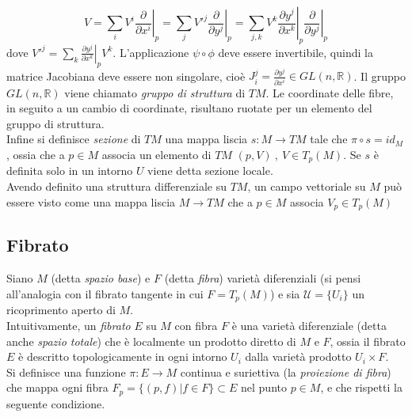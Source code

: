 $$
   V = \sum_i V^i  \left. \frac{\partial}{\partial x^i} \right |_p
     = \sum_j V'^j \left. \frac{\partial}{\partial y^j} \right |_p
     = \sum_{j,k}  V^k \left. \frac{\partial y^j}{\partial x^k} \right |_p
        \left. \frac{\partial}{\partial y^j} \right |_p
$$
dove $V'^j = \sum_k \left. \frac{\partial y^j}{\partial x^k}\right |_pV^k $.
L'applicazione $\psi \circ \phi$ deve essere invertibile, quindi la matrice Jacobiana
deve essere non singolare, cioè $J^j_i = \frac{\partial y^j}{\partial x^i} \in GL(n,\mathbb{R})$.
Il gruppo $GL(n,\mathbb{R})$ viene chiamato \emph{gruppo di struttura} di $TM$.
Le coordinate delle fibre, in seguito a un cambio di coordinate, risultano ruotate
per un elemento del gruppo di struttura.\\
Infine si definisce \emph{sezione} di $TM$ una mappa liscia $s : M \to TM$ tale
che $\pi \circ s = id_M$, ossia che a $p \in M$ associa un elemento di $TM$ $(p,V)
\: ,\: V \in T_p(M)$. Se $s$ è definita solo in un intorno $U$ viene detta sezione locale.\\

Avendo definito una struttura differenziale su $TM$, un campo vettoriale su $M$
può essere visto come una mappa liscia $M \to TM$ che a $p \in M$ associa $V_p \in T_p(M)$\\

\subsection{Fibrato}
Siano $M$ (detta \emph{spazio base}) e $F$ (detta \emph{fibra}) varietà diferenziali
(si pensi all'analogia con il fibrato tangente in cui $F=T_p(M)$) e sia
$\mathcal{U} = \{U_i\}$ un ricoprimento aperto di $M$.\\

Intuitivamente, un \emph{fibrato} $E$ su $M$ con fibra $F$ è una varietà diferenziale
(detta anche \emph{spazio totale}) che è localmente un prodotto diretto di $M$ e $F$,
ossia il fibrato $E$ è descritto topologicamente in ogni intorno $U_i$
dalla varietà prodotto $U_i \times F$.\\

Si definisce una funzione $\pi : E \to M$ continua e suriettiva (la
\emph{proiezione di fibra}) che mappa ogni fibra $F_p = \{ (p,f) | f \in F\}
\subset E$ nel punto $ p\in M$, e che rispetti la seguente condizione.\\

